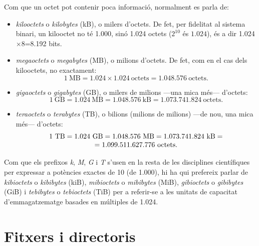 Com que un octet pot contenir poca informació, normalment es parla de:
\begin{itemize}
\item \emph{kilooctets} o \emph{kilobytes} (kB), o milers d'octets.
  De fet, per fidelitat al sistema binari, un kilooctet no té 1.000,
  sinó 1.024 octets ($2^{10}$ és $1.024$), és a dir
  1.024$\times$8=8.192 bits.
\item \emph{megaoctets} o \emph{megabytes} (MB), o milions d'octets.
  De fet, com en el cas dels kilooctets, no exactament:
$$1~\mbox{MB} = 1.024 \times 1.024~\mbox{octets}= 1.048.576~\mbox{octets}.$$
\item \emph{gigaoctets} o \emph{gigabytes} (GB), o milers de milions
  ---una mica més--- d'octets:
$$1~\mbox{GB}=1.024~\mbox{MB}=1.048.576~\mbox{kB}=1.073.741.824~\mbox{octets}.$$
\item \emph{teraoctets} o \emph{terabytes} (TB), o bilions (milions de
  milions) ---de nou, una mica més--- d'octets:
\[
\begin{array}{c}
$$1~\mbox{TB}=1.024~\mbox{GB}=1.048.576~\mbox{MB}=1.073.741.824~\mbox{kB}=\\
=1.099.511.627.776~\mbox{octets}.$$
\end{array}
\]
\end{itemize}
Com que els prefixos \emph{k}, \emph{M}, \emph{G} i \emph{T} s'usen en
la resta de les disciplines científiques per expressar a potències
exactes de 10 (de 1.000), hi ha qui prefereix parlar de
\emph{kibioctets} o \emph{kibibytes} (kiB), \emph{mibioctets} o
\emph{mibibytes} (MiB), \emph{gibioctets} o \emph{gibibytes} (GiB) i
\emph{tebibytes} o \emph{tebioctets} (TiB) per a referir-se a les
unitats de capacitat d'emmagatzematge basades en múltiples de 1.024.




\section{Fitxers i directoris}
\label{se:fitxers}
\label{pg:fitxer}

